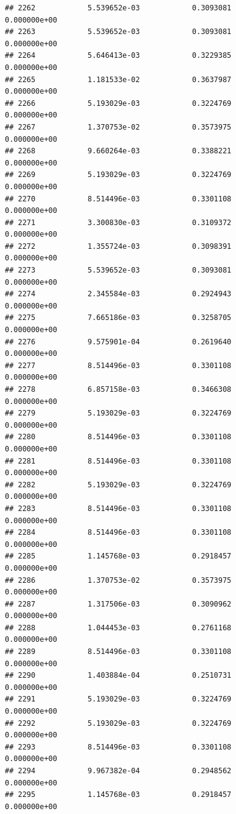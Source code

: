 \documentclass[
]{article}
\begin{document}
\begin{verbatim}
## 2262            5.539652e-03            0.3093081            0.000000e+00
## 2263            5.539652e-03            0.3093081            0.000000e+00
## 2264            5.646413e-03            0.3229385            0.000000e+00
## 2265            1.181533e-02            0.3637987            0.000000e+00
## 2266            5.193029e-03            0.3224769            0.000000e+00
## 2267            1.370753e-02            0.3573975            0.000000e+00
## 2268            9.660264e-03            0.3388221            0.000000e+00
## 2269            5.193029e-03            0.3224769            0.000000e+00
## 2270            8.514496e-03            0.3301108            0.000000e+00
## 2271            3.300830e-03            0.3109372            0.000000e+00
## 2272            1.355724e-03            0.3098391            0.000000e+00
## 2273            5.539652e-03            0.3093081            0.000000e+00
## 2274            2.345584e-03            0.2924943            0.000000e+00
## 2275            7.665186e-03            0.3258705            0.000000e+00
## 2276            9.575901e-04            0.2619640            0.000000e+00
## 2277            8.514496e-03            0.3301108            0.000000e+00
## 2278            6.857158e-03            0.3466308            0.000000e+00
## 2279            5.193029e-03            0.3224769            0.000000e+00
## 2280            8.514496e-03            0.3301108            0.000000e+00
## 2281            8.514496e-03            0.3301108            0.000000e+00
## 2282            5.193029e-03            0.3224769            0.000000e+00
## 2283            8.514496e-03            0.3301108            0.000000e+00
## 2284            8.514496e-03            0.3301108            0.000000e+00
## 2285            1.145768e-03            0.2918457            0.000000e+00
## 2286            1.370753e-02            0.3573975            0.000000e+00
## 2287            1.317506e-03            0.3090962            0.000000e+00
## 2288            1.044453e-03            0.2761168            0.000000e+00
## 2289            8.514496e-03            0.3301108            0.000000e+00
## 2290            1.403884e-04            0.2510731            0.000000e+00
## 2291            5.193029e-03            0.3224769            0.000000e+00
## 2292            5.193029e-03            0.3224769            0.000000e+00
## 2293            8.514496e-03            0.3301108            0.000000e+00
## 2294            9.967382e-04            0.2948562            0.000000e+00
## 2295            1.145768e-03            0.2918457            0.000000e+00

\end{verbatim}
\end{document}
